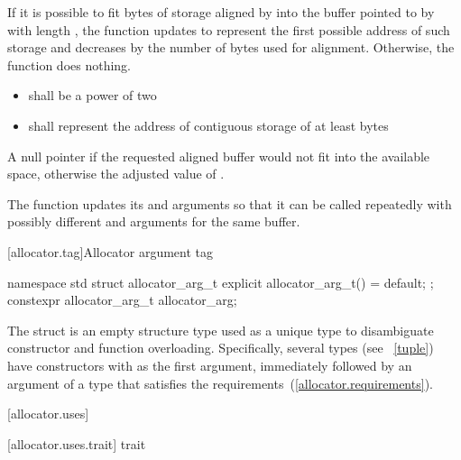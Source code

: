 \begin{itemdescr}
\pnum
\effects If it is possible to fit  bytes
of storage aligned by  into the buffer pointed to by
 with length , the function updates
 to represent the first possible address of such storage
and decreases  by the number of bytes used for alignment.
Otherwise, the function does nothing.

\pnum
\requires

\begin{itemize}
\item {} shall be a power of two

\item {} shall represent the address of contiguous storage of at least
 bytes
\end{itemize}

\pnum
\returns A null pointer if the requested aligned buffer
would not fit into the available space, otherwise the adjusted value
of .

\pnum
\begin{note} The function updates its 
and  arguments so that it can be called repeatedly
with possibly different  and 
arguments for the same buffer.  \end{note}
\end{itemdescr}

[allocator.tag]{Allocator argument tag}

%
%
\begin{itemdecl}
namespace std {
  struct allocator_arg_t { explicit allocator_arg_t() = default; };
  constexpr allocator_arg_t allocator_arg{};
}
\end{itemdecl}

\pnum
The  struct is an empty structure type used as a unique type to
disambiguate constructor and function overloading. Specifically, several types (see
~\ref{tuple}) have constructors with  as the first
argument, immediately followed by an argument of a type that satisfies the
 requirements~(\ref{allocator.requirements}).

[allocator.uses]{}

[allocator.uses.trait]{ trait}

